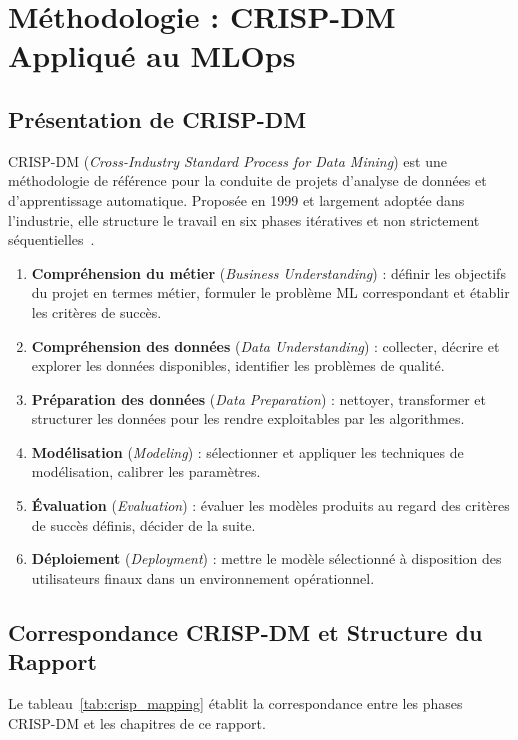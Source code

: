 \documentclass{rapportENSIAS}
\begin{document}
\section{Méthodologie : CRISP-DM Appliqué au MLOps}

\subsection{Présentation de CRISP-DM}

CRISP-DM (\textit{Cross-Industry Standard Process for Data Mining}) est une méthodologie de référence pour la conduite de projets d'analyse de données et d'apprentissage automatique. Proposée en 1999 et largement adoptée dans l'industrie, elle structure le travail en six phases itératives et non strictement séquentielles~\cite{wirth2000crisp}.

\begin{enumerate}
    \item \textbf{Compréhension du métier} (\textit{Business Understanding}) : définir les objectifs du projet en termes métier, formuler le problème ML correspondant et établir les critères de succès.
    \item \textbf{Compréhension des données} (\textit{Data Understanding}) : collecter, décrire et explorer les données disponibles, identifier les problèmes de qualité.
    \item \textbf{Préparation des données} (\textit{Data Preparation}) : nettoyer, transformer et structurer les données pour les rendre exploitables par les algorithmes.
    \item \textbf{Modélisation} (\textit{Modeling}) : sélectionner et appliquer les techniques de modélisation, calibrer les paramètres.
    \item \textbf{Évaluation} (\textit{Evaluation}) : évaluer les modèles produits au regard des critères de succès définis, décider de la suite.
    \item \textbf{Déploiement} (\textit{Deployment}) : mettre le modèle sélectionné à disposition des utilisateurs finaux dans un environnement opérationnel.
\end{enumerate}

\subsection{Correspondance CRISP-DM et Structure du Rapport}

Le tableau~\ref{tab:crisp_mapping} établit la correspondance entre les phases CRISP-DM et les chapitres de ce rapport.
\end{document}
